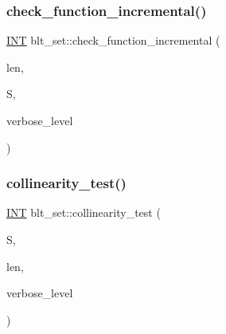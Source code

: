 \mbox{\label{classblt__set_ae898e6318ef4382066d94f50196b9b81}} 
\subsubsection{\texorpdfstring{check\+\_\+function\+\_\+incremental()}{check\_function\_incremental()}}
{\footnotesize\ttfamily \mbox{\hyperlink{galois_8h_a09fddde158a3a20bd2dcadb609de11dc}{I\+NT}} blt\+\_\+set\+::check\+\_\+function\+\_\+incremental (\begin{DoxyParamCaption}\item[{\mbox{\hyperlink{galois_8h_a09fddde158a3a20bd2dcadb609de11dc}{I\+NT}}}]{len,  }\item[{\mbox{\hyperlink{galois_8h_a09fddde158a3a20bd2dcadb609de11dc}{I\+NT}} $\ast$}]{S,  }\item[{\mbox{\hyperlink{galois_8h_a09fddde158a3a20bd2dcadb609de11dc}{I\+NT}}}]{verbose\+\_\+level }\end{DoxyParamCaption})}

\mbox{\label{classblt__set_a6031271267004d6f16cb6b59f9c31ec2}} 
\subsubsection{\texorpdfstring{collinearity\+\_\+test()}{collinearity\_test()}}
{\footnotesize\ttfamily \mbox{\hyperlink{galois_8h_a09fddde158a3a20bd2dcadb609de11dc}{I\+NT}} blt\+\_\+set\+::collinearity\+\_\+test (\begin{DoxyParamCaption}\item[{\mbox{\hyperlink{galois_8h_a09fddde158a3a20bd2dcadb609de11dc}{I\+NT}} $\ast$}]{S,  }\item[{\mbox{\hyperlink{galois_8h_a09fddde158a3a20bd2dcadb609de11dc}{I\+NT}}}]{len,  }\item[{\mbox{\hyperlink{galois_8h_a09fddde158a3a20bd2dcadb609de11dc}{I\+NT}}}]{verbose\+\_\+level }\end{DoxyParamCaption})}

\mbox{\label{classblt__set_a55487fb1d0a4af469511d2167a9baf37}} 
